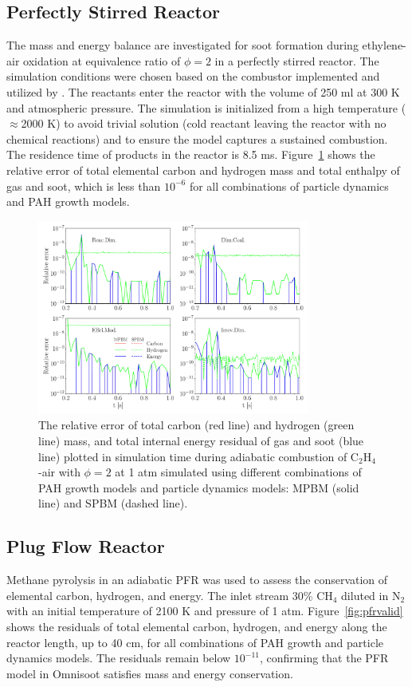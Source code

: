 \subsection{Perfectly Stirred Reactor}
\label{sec:psrvalid}
The mass and energy balance are investigated for soot formation during ethylene-air oxidation at equivalence ratio of $\phi=2$ in a perfectly stirred reactor. The simulation conditions were chosen based on the combustor implemented and utilized by \citet{stouffer2002combustion}. The reactants enter the reactor with the volume of 250 ml at 300 K and atmospheric pressure. The simulation is initialized from a high temperature ($\approx$2000 K) to avoid trivial solution (cold reactant leaving the reactor with no chemical reactions) and to ensure the model captures a sustained combustion. The residence time of products in the reactor is 8.5 ms. Figure~\ref{fig:psrvalid} shows the relative error of total elemental carbon and hydrogen mass and total enthalpy of gas and soot, which is less than $10^{-6}$ for all combinations of particle dynamics and PAH growth models.

\begin{figure}[H]
	\centering
	\includegraphics[width=0.8\textwidth]{Figures/Results/Validation/PSR/relerr_psr.pdf}
	\caption{The relative error of total carbon (red line) and hydrogen (green line) mass, and total internal energy residual of gas and soot (blue line) plotted in simulation time during adiabatic combustion of $\mathrm{C_2H_4}$-air with $\phi=2$ at 1 atm simulated using different combinations of PAH growth models and particle dynamics models: MPBM (solid line) and SPBM (dashed line).}
	\label{fig:psrvalid}
\end{figure}

\subsection{Plug Flow Reactor}
Methane pyrolysis in an adiabatic PFR was used to assess the conservation of elemental carbon, hydrogen, and energy. The inlet stream 30\% $\mathrm{CH_4}$ diluted in $\mathrm{N_2}$ with an initial temperature of 2100 K and pressure of 1 atm. Figure~\ref{fig:pfrvalid} shows the residuals of total elemental carbon, hydrogen, and energy along the reactor length, up to 40 cm, for all combinations of PAH growth and particle dynamics models. The residuals remain below $10^{-11}$, confirming that the PFR model in Omnisoot satisfies mass and energy conservation.




